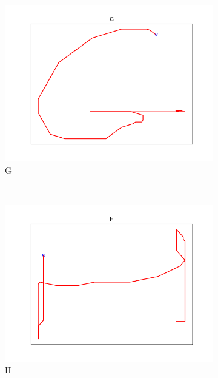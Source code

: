 \begin{figure}
\begin{subfigure}[b]{0.14\textwidth}
        \includegraphics[width=\textwidth]{images/gbem/letters_generated/G.png}
        \caption{G}
    \end{subfigure}
    ~
    \begin{subfigure}[b]{0.14\textwidth}
        \includegraphics[width=\textwidth]{images/gbem/letters_generated/H.png}
        \caption{H}
    \end{subfigure}
    ~
    \begin{subfigure}[b]{0.14\textwidth}

\end{subfigure}
\end{figure}
